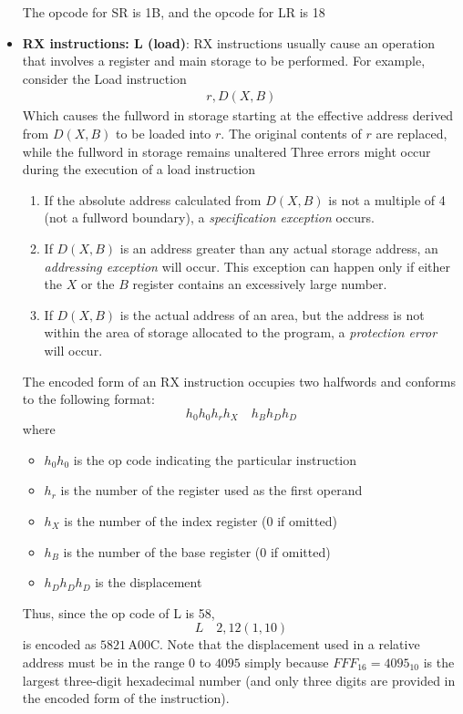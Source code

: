 \documentclass{report}
\begin{document}
\begin{itemize}
                    \bigbreak \noindent 
                    The opcode for SR is 1B, and the opcode for LR is 18
                \item \textbf{RX instructions: L (load)}: RX instructions usually cause an operation that involves a register and main storage to be performed. For example, consider the Load instruction
                    \begin{align*}
                        r,D(X,B)
                    \end{align*}
                    Which causes the fullword in storage starting at the effective address derived from $D(X,B)$ to be loaded into $r$. The original contents of $r$ are replaced, while the fullword in storage remains unaltered
                    \bigbreak \noindent 
                    Three errors might occur during the execution of a load instruction
                    \begin{enumerate}
                        \item If the absolute address calculated from \( D(X, B) \) is not a multiple of 4 (not a fullword boundary), a \textit{specification exception} occurs.
                        \item If \( D(X, B) \) is an address greater than any actual storage address, an \textit{addressing exception} will occur. This exception can happen only if either the \( X \) or the \( B \) register contains an excessively large number.
                        \item If \( D(X, B) \) is the actual address of an area, but the address is not within the area of storage allocated to the program, a \textit{protection error} will occur.
                    \end{enumerate}
                    The encoded form of an RX instruction occupies two halfwords and conforms to the following format:
                    \[
                        h_0 h_0 h_r h_X \quad h_B h_D h_D
                    \]
                    where
                    \begin{itemize}
                        \item $h_0 h_0$ is the op code indicating the particular instruction
                        \item $h_r$ is the number of the register used as the first operand
                        \item $h_X$ is the number of the index register (0 if omitted)
                        \item $h_B$ is the number of the base register (0 if omitted)
                        \item $h_D h_D h_D$ is the displacement
                    \end{itemize}
                    Thus, since the op code of L is 58,
                    \[
                        L \quad 2, 12(1, 10)
                    \]
                    is encoded as $5821 \, \text{A00C}$. Note that the displacement used in a relative address must be in the range $0$ to $4095$ simply because $FFF_{16} = 4095_{10}$ is the largest three-digit hexadecimal number (and only three digits are provided in the encoded form of the instruction).


\end{itemize}
\end{document}
